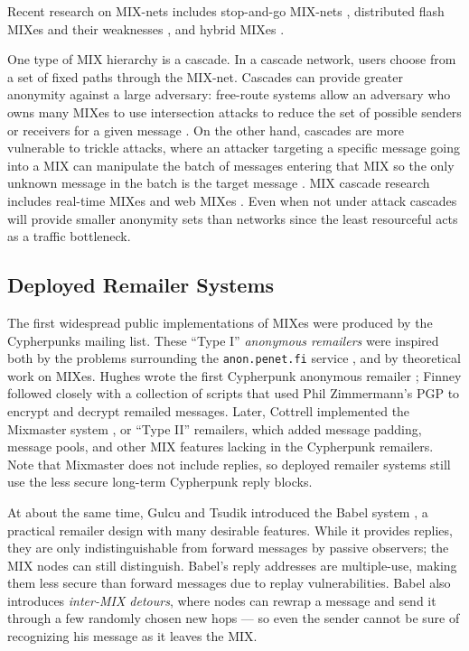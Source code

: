 \documentclass[11pt]{IEEEtran}
\begin{document}
Recent research on MIX-nets includes stop-and-go MIX-nets
\cite{kesdogan}, distributed flash MIXes \cite{flash-mix} and their
weaknesses \cite{desmedt,mitkuro}, and hybrid MIXes \cite{hybrid-mix}.

One type of MIX hierarchy is a cascade.
In a cascade network, users choose from a set of fixed paths through
the MIX-net.
Cascades can provide greater anonymity against a large adversary:
free-route systems allow an adversary who owns many MIXes to use
intersection attacks to reduce the set of possible senders or receivers
for a given
message \cite{disad-free-routes}. On the other hand, cascades are more
vulnerable \cite{batching-taxonomy} to trickle attacks, where an attacker
targeting a specific message going into a MIX can manipulate the batch
of messages entering that MIX so the only unknown message in the batch
is the target message \cite{mixmaster-attacks,babel}.
MIX cascade research includes real-time MIXes \cite{realtime-mix} and
web MIXes \cite{web-mix}. Even when not under attack cascades will
provide smaller anonymity sets than networks since the least
resourceful acts as a traffic bottleneck.

\subsection{Deployed Remailer Systems}

The first widespread public implementations of MIXes were produced by the
Cypherpunks mailing list. These ``Type I'' \emph{anonymous remailers}
were inspired both by the problems surrounding the {\tt anon.penet.fi}
service \cite{helsingius}, and by theoretical work on MIXes. Hughes wrote
the first Cypherpunk anonymous remailer \cite{remailer-history}; Finney
followed closely with a collection of scripts that used Phil Zimmermann's
PGP to encrypt and decrypt remailed messages. Later, Cottrell implemented
the Mixmaster system \cite{mixmaster,mixmaster-spec}, or ``Type II'' remailers,
which added message padding, message pools, and other MIX features lacking
in the Cypherpunk remailers. Note that Mixmaster does not include replies,
so deployed remailer systems still use the less secure
long-term Cypherpunk reply blocks.

At about the same time, Gulcu and Tsudik introduced the Babel
system \cite{babel}, a practical remailer design with many desirable
features. While it provides replies, they are only indistinguishable
from forward messages by passive observers; the MIX nodes can still
distinguish. Babel's reply addresses are multiple-use, making them less
secure than forward messages due to replay vulnerabilities. Babel also
introduces \emph{inter-MIX detours}, where nodes can rewrap a message
and send it through a few randomly chosen new hops --- so even the sender
cannot be sure of recognizing his message as it leaves the MIX.
\end{document}
